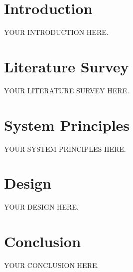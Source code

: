 \documentclass[12pt,a4paper]{article}
\begin{document}





\tableofcontents

\clearpage
\section{Introduction}

YOUR INTRODUCTION HERE.


\clearpage
\section{Literature Survey}

YOUR LITERATURE SURVEY HERE.


\clearpage
\section{System Principles}

YOUR SYSTEM PRINCIPLES HERE.


\clearpage
\section{Design}

YOUR DESIGN HERE.


\clearpage
\section{Conclusion}

YOUR CONCLUSION HERE.

\clearpage
\nocite{*}
\printbibliography
\end{document}
